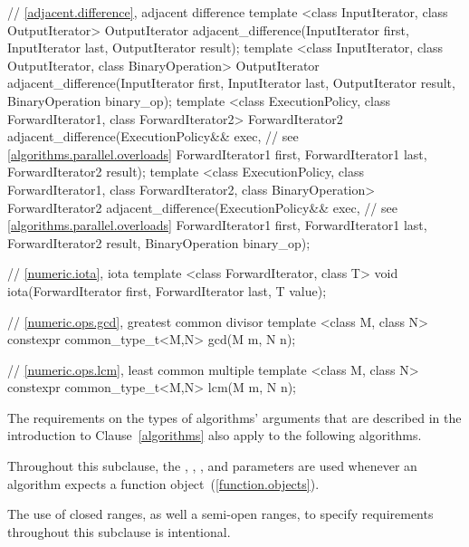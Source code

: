 \begin{codeblock}
{  // \ref{adjacent.difference}, adjacent difference
  template <class InputIterator, class OutputIterator>
    OutputIterator adjacent_difference(InputIterator first,
                                       InputIterator last,
                                       OutputIterator result);
  template <class InputIterator, class OutputIterator, class BinaryOperation>
    OutputIterator adjacent_difference(InputIterator first,
                                       InputIterator last,
                                       OutputIterator result,
                                       BinaryOperation binary_op);
  template <class ExecutionPolicy, class ForwardIterator1, class ForwardIterator2>
    ForwardIterator2 adjacent_difference(ExecutionPolicy&& exec, // see \ref{algorithms.parallel.overloads}
                                         ForwardIterator1 first,
                                         ForwardIterator1 last,
                                         ForwardIterator2 result);
  template <class ExecutionPolicy, class ForwardIterator1, class ForwardIterator2,
            class BinaryOperation>
    ForwardIterator2 adjacent_difference(ExecutionPolicy&& exec, // see \ref{algorithms.parallel.overloads}
                                         ForwardIterator1 first,
                                         ForwardIterator1 last,
                                         ForwardIterator2 result,
                                         BinaryOperation binary_op);

  // \ref{numeric.iota}, iota
  template <class ForwardIterator, class T>
    void iota(ForwardIterator first, ForwardIterator last, T value);

  // \ref{numeric.ops.gcd}, greatest common divisor
  template <class M, class N>
    constexpr common_type_t<M,N> gcd(M m, N n);

  // \ref{numeric.ops.lcm}, least common multiple
  template <class M, class N>
    constexpr common_type_t<M,N> lcm(M m, N n);
}
\end{codeblock}

\pnum
The requirements on the types of algorithms' arguments that are
described in the introduction to Clause~\ref{algorithms} also
apply to the following algorithms.

\pnum
Throughout this subclause, the , ,
, and  parameters are used
whenever an algorithm expects a function object~(\ref{function.objects}).

\pnum
\begin{note}
The use of closed ranges, as well a semi-open ranges, to specify requirements
throughout this subclause is intentional.
\end{note}

